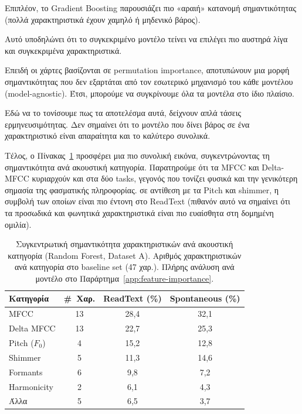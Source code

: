 Επιπλέον, το Gradient Boosting παρουσιάζει πιο «αραιή» κατανομή σημαντικότητας (πολλά χαρακτηριστικά έχουν χαμηλό ή μηδενικό βάρος).

Αυτό υποδηλώνει ότι το συγκεκριμένο μοντέλο τείνει να επιλέγει πιο αυστηρά λίγα και συγκεκριμένα χαρακτηριστικά.

Επειδή οι χάρτες βασίζονται σε permutation importance, αποτυπώνουν μια μορφή σημαντικότητας που δεν εξαρτάται από τον εσωτερικό μηχανισμό του κάθε μοντέλου (model-agnostic). 
Έτσι, μπορούμε να συγκρίνουμε όλα τα μοντέλα στο ίδιο πλαίσιο.

Εδώ να το τονίσουμε πως τα αποτελέσμα αυτά, δείχνουν απλά τάσεις ερμηνευσιμότητας. 
Δεν σημαίνει ότι το μοντέλο που δίνει βάρος σε ένα χαρακτηριστικό είναι απαραίτητα και το καλύτερο συνολικά.

Τέλος, ο Πίνακας~\ref{tab:category-importance-main} προσφέρει μια πιο συνολική εικόνα, συγκεντρώνοντας τη σημαντικότητα ανά ακουστική κατηγορία. 
Παρατηρούμε ότι τα MFCC και Delta-MFCC κυριαρχούν και στα δύο tasks, γεγονός που τονίζει φυσικά και την γενικότερη σημασία της φασματικής πληροφορίας.
σε αντίθεση με τα Pitch και \gls{shimmer}, η συμβολή των οποίων είναι πιο έντονη στο ReadText (πιθανόν αυτό να σημαίνει ότι τα προσωδικά και φωνητικά χαρακτηριστικά είναι πιο ευαίσθητα στη δομημένη ομιλία). 

\begin{table}[H]
\centering
\caption{Συγκεντρωτική σημαντικότητα χαρακτηριστικών ανά ακουστική κατηγορία (Random Forest, Dataset A). Αριθμός χαρακτηριστικών ανά κατηγορία στο baseline set (47 χαρ.). Πλήρης ανάλυση ανά μοντέλο στο Παράρτημα~\ref{app:feature-importance}.}
\label{tab:category-importance-main}
\begin{tabular}{@{}lccc@{}}
\toprule
\textbf{Κατηγορία} & \textbf{\#~Χαρ.} & \textbf{ReadText (\%)} & \textbf{Spontaneous (\%)} \\
\midrule
MFCC & 13 & 28{,}4 & 32{,}1 \\
Delta MFCC & 13 & 22{,}7 & 25{,}3 \\
Pitch ($F_0$) & 4 & 15{,}2 & 12{,}8 \\
Shimmer & 5 & 11{,}3 & 14{,}6 \\
Formants & 6 & 9{,}8 & 7{,}2 \\
Harmonicity & 2 & 6{,}1 & 4{,}3 \\
Άλλα & 5 & 6{,}5 & 3{,}7 \\
\bottomrule
\end{tabular}
\end{table}

